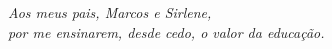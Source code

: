 \documentclass[
	12pt,				%
	openright,			%
	twoside,			%
	a4paper,			%
	english,			%
	french,				%
	spanish,			%
	brazil				%
	]{abntex2}
\begin{document}
% 

\begin{comment}
\begin{folhadeaprovacao}
  \begin{center}
    {\ABNTEXchapterfont\large\imprimirautor}
    \vspace*{\fill}\vspace*{\fill}
    \begin{center}
      \ABNTEXchapterfont\bfseries\Large\imprimirtitulo
    \end{center}
    \vspace*{\fill}
    \hspace{.45\textwidth}
    \begin{minipage}{.5\textwidth}
        \imprimirpreambulo
    \end{minipage}%
    \vspace*{\fill}
   \end{center}
   Trabalho aprovado. \imprimirlocal, 22 de março de 2017:
   \assinatura{\textbf{\imprimirorientador} \\ Orientador}
   \assinatura{\textbf{Professor} \\ Convidado 1}
   \assinatura{\textbf{Professor} \\ Convidado 2}
   \assinatura{\textbf{Professor} \\ Convidado 3}
   \assinatura{\textbf{Professor} \\ Convidado 4}
   \begin{center}
    \vspace*{0.5cm}
    {\large\imprimirlocal}
    \par
    {\large\imprimirdata}
    \vspace*{1cm}
  \end{center}  
\end{folhadeaprovacao}
\end{comment}

\begin{dedicatoria}
   \vspace*{\fill}
   \centering
   \noindent
   \textit{Aos meus pais, Marcos e Sirlene,\\ por me ensinarem, desde cedo, o valor da educação.} \vspace*{\fill}
\end{dedicatoria}
\end{document}
